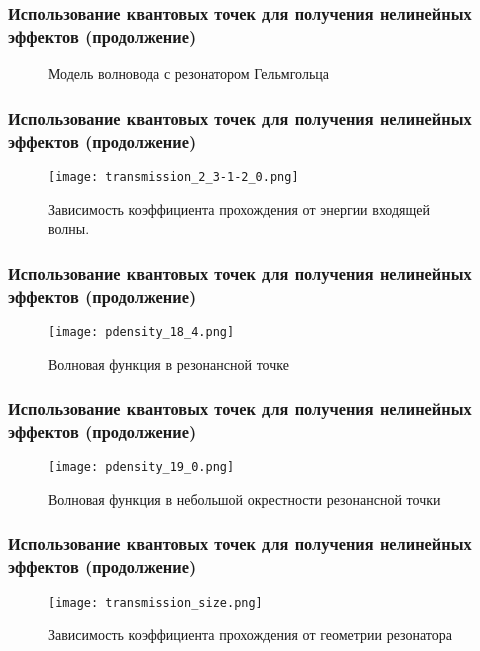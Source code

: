 \documentclass{beamer}
\begin{document}
\begin{frame}[fragile]
\frametitle{Использование квантовых точек для получения нелинейных эффектов (продолжение)}
\begin{figure}
\begin{tikzpicture}[scale=0.5]

\end{tikzpicture}
\caption{Модель волновода с резонатором Гельмгольца}
\end{figure}
\end{frame}

\begin{frame}[fragile]
\frametitle{Использование квантовых точек для получения нелинейных эффектов (продолжение)}
\begin{figure}
\texttt{[image: transmission\_2\_3-1-2\_0.png]}
\caption{Зависимость коэффициента прохождения от энергии входящей волны.}
\end{figure}
\end{frame}

\begin{frame}[fragile]
\frametitle{Использование квантовых точек для получения нелинейных эффектов (продолжение)}
\begin{figure}
\texttt{[image: pdensity\_18\_4.png]}
\caption{Волновая функция в резонансной точке}
\end{figure}
\end{frame}

\begin{frame}[fragile]
\frametitle{Использование квантовых точек для получения нелинейных эффектов (продолжение)}
\begin{figure}
\texttt{[image: pdensity\_19\_0.png]}
\caption{Волновая функция в небольшой окрестности резонансной точки}
\end{figure}
\end{frame}

\begin{frame}[fragile]
\frametitle{Использование квантовых точек для получения нелинейных эффектов (продолжение)}
\begin{figure}
\texttt{[image: transmission\_size.png]}
\caption{Зависимость коэффициента прохождения от геометрии резонатора}
\end{figure}
\end{frame}

\end{document}
